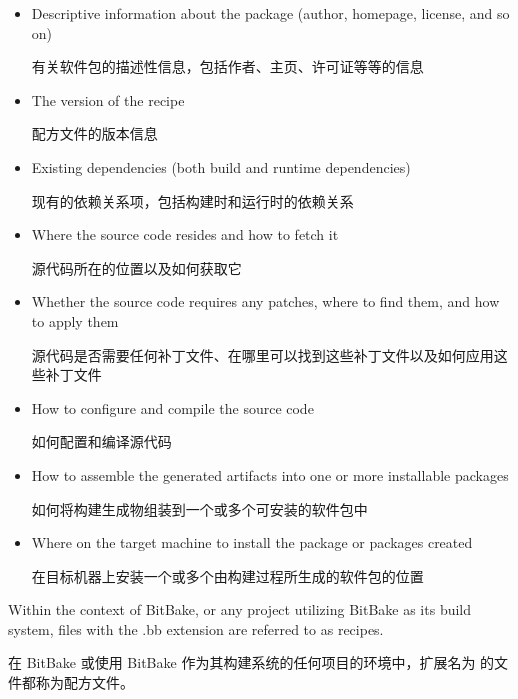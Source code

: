 \begin{itemize}
\setlength\itemsep{1.0em}

    \item Descriptive information about the package (author, homepage, license, and so on)
    
    \medskip
    有关软件包的描述性信息，包括作者、主页、许可证等等的信息

    \item The version of the recipe
    
    \medskip
    配方文件的版本信息

    \item Existing dependencies (both build and runtime dependencies)
    
    \medskip
    现有的依赖关系项，包括构建时和运行时的依赖关系

    \item Where the source code resides and how to fetch it
    
    \medskip
    源代码所在的位置以及如何获取它

    \item Whether the source code requires any patches, where to find them, and how to apply them
    
    \medskip
    源代码是否需要任何补丁文件、在哪里可以找到这些补丁文件以及如何应用这些补丁文件

    \item How to configure and compile the source code
    
    \medskip
    如何配置和编译源代码

    \item How to assemble the generated artifacts into one or more installable packages
    
    \medskip
    如何将构建生成物组装到一个或多个可安装的软件包中

    \item Where on the target machine to install the package or packages created
    
    \medskip
    在目标机器上安装一个或多个由构建过程所生成的软件包的位置

\end{itemize}

Within the context of BitBake, or any project utilizing BitBake as its build system, files with the .bb extension are referred to as recipes.

在 BitBake 或使用 BitBake 作为其构建系统的任何项目的环境中，扩展名为  的文件都称为配方文件。

